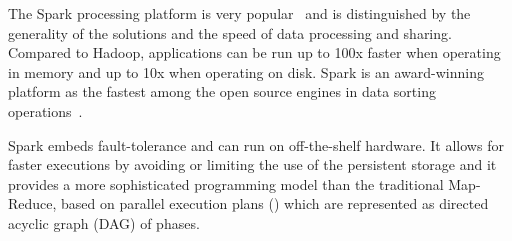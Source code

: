 
The Spark processing platform is very popular~\cite{articleApacheSpark:2015} and is distinguished by the generality of the solutions and the speed of data processing and sharing. Compared to Hadoop, applications can be run up to 100x faster when operating in memory and up to 10x when operating on disk. Spark is an award-winning platform as the fastest among the open source engines in data sorting operations~\cite{articleApacheSpark:2016}.


Spark embeds fault-tolerance and can run on off-the-shelf hardware. It allows for faster executions by avoiding or limiting the use of the persistent storage and it provides a more sophisticated programming model than the traditional Map-Reduce, based on parallel execution plans (\plans) which are represented as directed acyclic graph (DAG) of phases.

